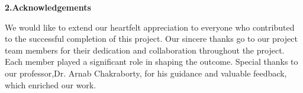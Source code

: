 \begin{center}
\textbf{{\huge 2.Acknowledgements}}
\vspace{ 2 mm}
\end{center} 
We would like to extend our heartfelt appreciation to everyone who contributed to the successful completion of this project. Our sincere thanks go to our project team members for their dedication and collaboration throughout the project. Each member played a significant role in shaping the outcome.
Special thanks to our professor,Dr. Arnab Chakraborty, for his guidance and valuable feedback, which enriched our work.\newline
\vspace{ 4 mm}
